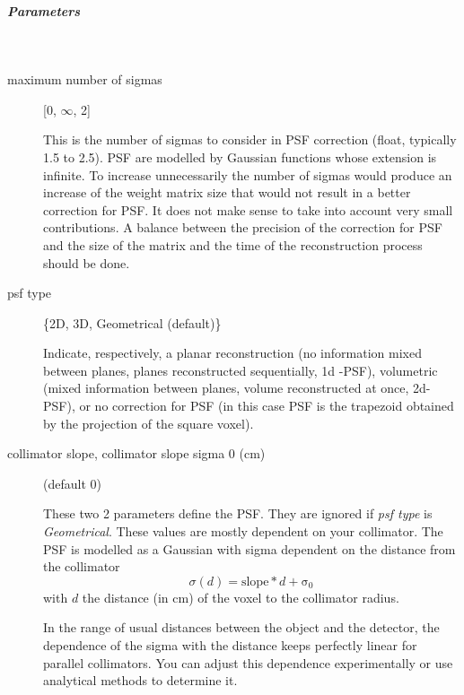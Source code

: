 \documentclass{article}
\newcommand{\subsubsubsubsection}[1]{\subparagraph{#1} \mbox{} \\}
\begin{document}
{{{ \subsubsubsubsection{Parameters} }
\begin{description}

\item[maximum number of sigmas] [0, $\infty$, 2{]}

This is the number of sigmas to consider in PSF correction (float, typically 1.5 to 2.5). PSF are modelled by Gaussian functions whose extension is infinite. To increase unnecessarily the number of sigmas would produce an increase of the weight matrix size that would not result in a better correction for PSF. It does not make sense to take into account very small contributions. A balance between the precision of the correction for PSF and the size of the matrix and the time of the reconstruction process should be done.


\item[psf type] \{2D, 3D, Geometrical (default)\}

Indicate, respectively, a planar reconstruction (no information mixed between planes, planes reconstructed sequentially, 1d -PSF), volumetric (mixed information between planes, volume reconstructed at once, 2d-PSF), or no correction for PSF (in this case PSF is the trapezoid obtained by the projection of the square voxel).

\item[collimator slope, collimator slope sigma 0 (cm)] (default 0)

These two 2 parameters define the PSF. They are ignored if \textit{psf type} is \textit{Geometrical}. These values are mostly dependent on your collimator. The PSF is modelled as a Gaussian with sigma dependent on the distance from the collimator
\begin{equation}
 \sigma(d) = \mathrm{slope} * d + \mathrm{\sigma_0}
\end{equation} 
\noindent with $d$ the distance (in cm) of the voxel to the collimator radius.

In the range of usual distances between the object and the detector, the dependence of the sigma with the distance keeps perfectly linear for parallel collimators. You can adjust this dependence experimentally or use analytical methods to determine it.


\end{description}}}
\end{document}
